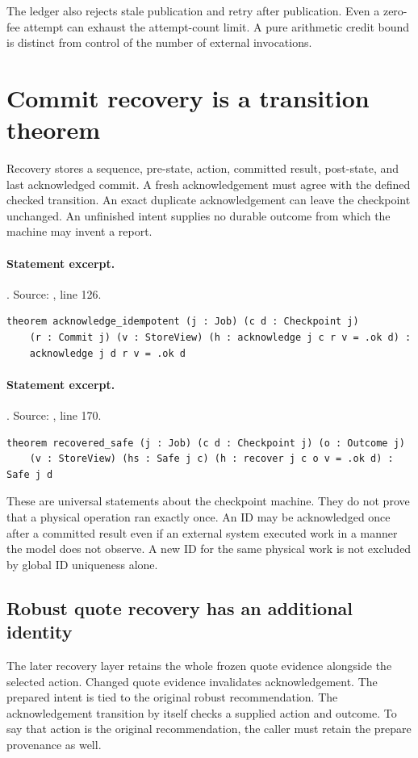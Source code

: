 \documentclass[11pt]{article}
\begin{document}
The ledger also rejects stale publication and retry after publication. Even a
zero-fee attempt can exhaust the attempt-count limit. A pure arithmetic credit
bound is distinct from control of the number of external invocations.

\section{Commit recovery is a transition theorem}
Recovery stores a sequence, pre-state, action, committed result, post-state,
and last acknowledged commit. A fresh acknowledgement must agree with the
defined checked transition. An exact duplicate acknowledgement can leave the
checkpoint unchanged. An unfinished intent supplies no durable outcome from
which the machine may invent a report.

\paragraph{Statement excerpt.}. Source: , line 126.
\begin{lstlisting}[style=AVOCSource]
theorem acknowledge_idempotent (j : Job) (c d : Checkpoint j)
    (r : Commit j) (v : StoreView) (h : acknowledge j c r v = .ok d) :
    acknowledge j d r v = .ok d
\end{lstlisting}

\paragraph{Statement excerpt.}. Source: , line 170.
\begin{lstlisting}[style=AVOCSource]
theorem recovered_safe (j : Job) (c d : Checkpoint j) (o : Outcome j)
    (v : StoreView) (hs : Safe j c) (h : recover j c o v = .ok d) : Safe j d
\end{lstlisting}


These are universal statements about the checkpoint machine. They do not prove
that a physical operation ran exactly once. An ID may be acknowledged once
after a committed result even if an external system executed work in a manner
the model does not observe. A new ID for the same physical work is not excluded
by global ID uniqueness alone.

\subsection{Robust quote recovery has an additional identity}
The later recovery layer retains the whole frozen quote evidence alongside
the selected action. Changed quote evidence invalidates acknowledgement.
The prepared intent is tied to the original robust recommendation. The
acknowledgement transition by itself checks a supplied action and outcome. To
say that action is the original recommendation, the caller must retain the
prepare provenance as well.
\end{document}
